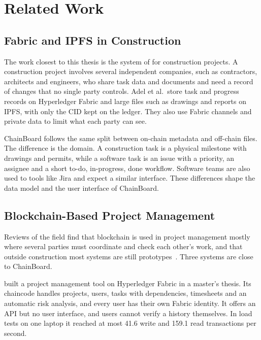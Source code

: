 \chapter{Related Work}
\label{ch:related}

\section{Fabric and IPFS in Construction}
\label{sec:adel}

The work closest to this thesis is the system of \textcite{adel2023} for construction projects. A construction project involves several independent companies, such as contractors, architects and engineers, who share task data and documents and need a record of changes that no single party controls. Adel et al.\ store task and progress records on Hyperledger Fabric and large files such as drawings and reports on IPFS, with only the CID kept on the ledger. They also use Fabric channels and private data to limit what each party can see.

ChainBoard follows the same split between on-chain metadata and off-chain files. The difference is the domain. A construction task is a physical milestone with drawings and permits, while a software task is an issue with a priority, an assignee and a short to-do, in-progress, done workflow. Software teams are also used to tools like Jira and expect a similar interface. These differences shape the data model and the user interface of ChainBoard.

\section{Blockchain-Based Project Management}
\label{sec:related-pm}

Reviews of the field find that blockchain is used in project management mostly where several parties must coordinate and check each other's work, and that outside construction most systems are still prototypes~\cite{noteboom2026coordination}. Three systems are close to ChainBoard.

\textcite{batista2021} built a project management tool on Hyperledger Fabric in a master's thesis. Its chaincode handles projects, users, tasks with dependencies, timesheets and an automatic risk analysis, and every user has their own Fabric identity. It offers an API but no user interface, and users cannot verify a history themselves. In load tests on one laptop it reached at most 41.6 write and 159.1 read transactions per second.

